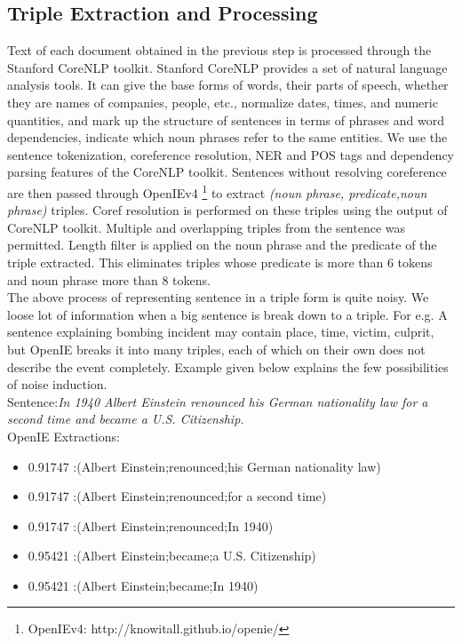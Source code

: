 \subsection{Triple Extraction and Processing}
\label{sec:tripleextraction}
Text of each document obtained in the previous step is processed through the Stanford CoreNLP toolkit\cite{manning2014stanford}. Stanford CoreNLP provides a set of natural language analysis tools. It can give the base forms of words, their parts of speech, whether they are names of companies, people, etc., 
normalize dates, times, and numeric quantities, and mark up the structure of sentences in terms of phrases and word dependencies, indicate which noun phrases refer to the same entities. 
We use the sentence tokenization, coreference resolution, NER and POS tags and dependency parsing features of the CoreNLP toolkit.
Sentences without resolving coreference are then passed through OpenIEv4 \footnote{OpenIEv4: http://knowitall.github.io/openie/} to extract  \textit{(noun phrase, predicate,noun phrase)} triples. 
Coref resolution is performed on these triples using the output of CoreNLP toolkit. 
Multiple and overlapping triples from the sentence was permitted. Length filter is applied on the noun phrase and the predicate of the triple extracted. This eliminates
triples whose predicate is more than 6 tokens and noun phrase more than 8 tokens.\\
The above process of representing sentence in a triple form is quite noisy. We loose lot of information when a big sentence is break down to a triple. 
For e.g. A sentence explaining bombing incident may contain place, time, victim, culprit, but OpenIE breaks it into many triples, each of which on their own does not describe the event completely.
Example given below explains the few possibilities of noise induction.\\
Sentence:\textit{In 1940 Albert Einstein renounced his German nationality law for a second time and became a U.S. Citizenship.}\\
OpenIE Extractions:
\begin{itemize}
\item{0.91747 :(Albert Einstein;renounced;his German nationality law)}
\item{0.91747 :(Albert Einstein;renounced;for a second time)}
\item{0.91747 :(Albert Einstein;renounced;In 1940)}
\item{0.95421 :(Albert Einstein;became;a U.S. Citizenship)}
\item{0.95421 :(Albert Einstein;became;In 1940)}
\end{itemize}

